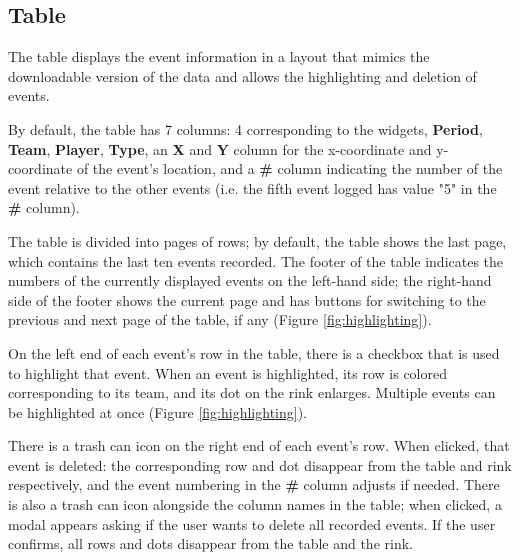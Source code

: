 \documentclass[letterpaper]{article}
\begin{document}
\subsection{Table} \label{table}
The table displays the event information in a layout that mimics the downloadable version of the data and allows the highlighting and deletion of events.

By default, the table has 7 columns: 4 corresponding to the widgets, \textbf{Period}, \textbf{Team}, \textbf{Player}, \textbf{Type},  an \textbf{X} and \textbf{Y} column for the x-coordinate and y-coordinate of the event's location, and a \textbf{\#} column indicating the number of the event relative to the other events (i.e. the fifth event logged has value "5" in the \textbf{\#} column).

The table is divided into pages of rows; by default, the table shows the last page, which contains the last ten events recorded. The footer of the table indicates the numbers of the currently displayed events on the left-hand side; the right-hand side of the footer shows the current page and has buttons for switching to the previous and next page of the table, if any (Figure \ref{fig:highlighting}).

On the left end of each event's row in the table, there is a checkbox that is used to highlight that event. When an event is highlighted, its row is colored corresponding to its team, and its dot on the rink enlarges. Multiple events can be highlighted at once (Figure \ref{fig:highlighting}).

There is a trash can icon on the right end of each event's row. When clicked, that event is deleted: the corresponding row and dot disappear from the table and rink respectively, and the event numbering in the \textbf{\#} column adjusts if needed. There is also a trash can icon alongside the column names in the table; when clicked, a modal appears asking if the user wants to delete all recorded events. If the user confirms, all rows and dots disappear from the table and the rink.
\end{document}
